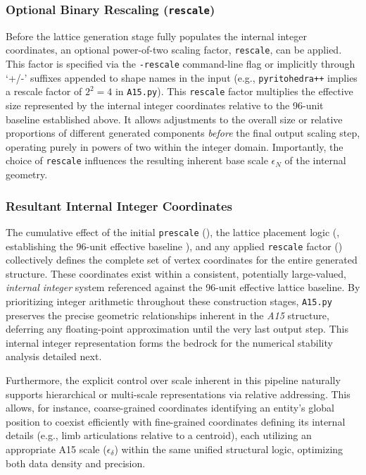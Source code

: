 \documentclass[10pt]{article}
\def\AAAB{\textit{A15}}
\begin{document}
\subsubsection{Optional Binary Rescaling (\texttt{rescale})}\label{subsubsec-scaling-rescale}
Before the lattice generation stage fully populates the internal integer coordinates, an optional power-of-two scaling factor, \texttt{rescale}, can be applied. This factor is specified via the \texttt{-rescale} command-line flag or implicitly through `+/-' suffixes appended to shape names in the input (e.g., \texttt{pyritohedra++} implies a rescale factor of $2^2=4$ in \texttt{A15.py}). This \texttt{rescale} factor multiplies the effective size represented by the internal integer coordinates relative to the 96-unit baseline established above. It allows adjustments to the overall size or relative proportions of different generated components \emph{before} the final output scaling step, operating purely in powers of two within the integer domain. Importantly, the choice of \texttt{rescale} influences the resulting inherent base scale $\epsilon_N$ of the internal geometry.

\subsubsection{Resultant Internal Integer Coordinates}\label{subsubsec-scaling-internal}
The cumulative effect of the initial \texttt{prescale} (), the lattice placement logic (, establishing the 96-unit effective baseline ), and any applied \texttt{rescale} factor () collectively defines the complete set of vertex coordinates for the entire generated structure. These coordinates exist within a consistent, potentially large-valued, \emph{internal integer} system referenced against the 96-unit effective lattice baseline. By prioritizing integer arithmetic throughout these construction stages, \texttt{A15.py} preserves the precise geometric relationships inherent in the \AAAB{} structure, deferring any floating-point approximation until the very last output step. This internal integer representation forms the bedrock for the numerical stability analysis detailed next.

Furthermore, the explicit control over scale inherent in this pipeline naturally supports hierarchical or multi-scale representations via relative addressing. This allows, for instance, coarse-grained coordinates identifying an entity's global position to coexist efficiently with fine-grained coordinates defining its internal details (e.g., limb articulations relative to a centroid), each utilizing an appropriate A15 scale ($\epsilon_\delta$) within the same unified structural logic, optimizing both data density and precision.
\end{document}
